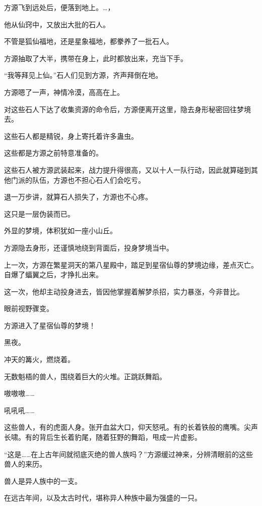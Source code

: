 
\begin{this_body}

方源飞到远处后，便落到地上。…，

他从仙窍中，又放出大批的石人。

不管是狐仙福地，还是星象福地，都豢养了一批石人。

方源抽取了大半，携带在身上，此时都放出来，充当下手。

“我等拜见上仙。”石人们见到方源，齐声拜倒在地。

方源嗯了一声，神情冷漠，高高在上。

对这些石人下达了收集资源的命令后，方源便离开这里，隐去身形秘密回往梦境去。

这些石人都是精锐，身上寄托着许多蛊虫。

这些都是方源之前特意准备的。

这些石人被方源武装起来，战力提升得很高，又以十人一队行动，因此就算碰到其他门派的队伍，方源也不担心石人们会吃亏。

退一万步讲，就算石人损失了，方源也不心疼。

这只是一层伪装而已。

外显的梦境，体积犹如一座小山丘。

方源隐去身形，还谨慎地绕到背面后，投身梦境当中。

上一次，方源在繁星洞天的第八星殿中，踏足到星宿仙尊的梦境边缘，差点灭亡。自爆了蝠翼之后，才挣扎出来。

这一次，他却主动投身进去，皆因他掌握着解梦杀招，实力暴涨，今非昔比。

眼前视野骤变。

方源进入了星宿仙尊的梦境！

黑夜。

冲天的篝火，燃烧着。

无数魁梧的兽人，围绕着巨大的火堆。正跳跃舞蹈。

嗷嗷嗷……

吼吼吼……

这些兽人，有的虎面人身。张开血盆大口，仰天怒吼。有的长着铁般的鹰嘴。尖声长啸。有的背后生长着豹尾，随着狂野的舞蹈，甩成一片虚影。

“这是……在上古年间就彻底灭绝的兽人族吗？”方源缓过神来，分辨清眼前的这些兽人的来历。

兽人是异人族中的一支。

在远古年间，以及太古时代，堪称异人种族中最为强盛的一只。


\end{this_body}
